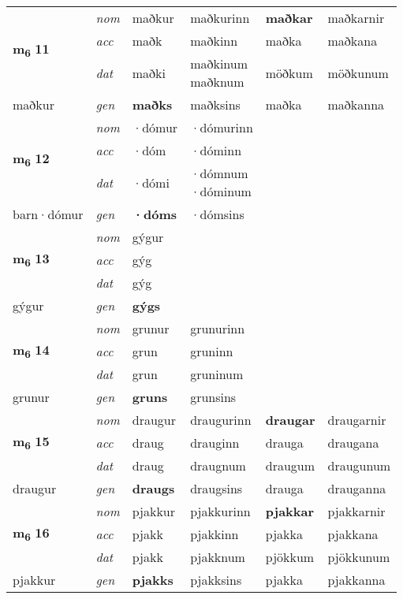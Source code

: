 \begin{longtable}[l]{X>{\footnotesize\itshape}XXXXX}
\multirow{3}{*}{{{\textbf{m{\textsubscript{6}}} \Large{\textbf{11}}}}} & nom & maðkur & maðkurinn & \textbf{maðkar} & maðkarnir \\*
 & acc & maðk & maðkinn & maðka & maðkana \\*
 & dat & maðki & \specialcell{maðkinum\\ maðknum} & möðkum & möðkunum \\*
 {\footnotesize{maðkur}} & gen & \textbf{maðks} & maðksins & maðka & maðkanna \\
\cmidrule{1-6}

\multirow{3}{*}{{{\textbf{m{\textsubscript{6}}} \Large{\textbf{12}}}}} & nom & ·dómur & ·dómurinn & \textbf{} &  \\*
 & acc & ·dóm & ·dóminn &  &  \\*
 & dat & ·dómi & \specialcell{·dómnum\\  ·dóminum} &  &  \\*
 {\footnotesize{barn\allowbreak ·dómur}} & gen & \textbf{·dóms} & ·dómsins &  &  \\
\cmidrule{1-6}

\multirow{3}{*}{{{\textbf{m{\textsubscript{6}}} \Large{\textbf{13}}}}} & nom & gýgur &  & \textbf{} &  \\*
 & acc & gýg &  &  &  \\*
 & dat & gýg &  &  &  \\*
 {\footnotesize{gýgur}} & gen & \textbf{gýgs} &  &  &  \\
\cmidrule{1-6}

\multirow{3}{*}{{{\textbf{m{\textsubscript{6}}} \Large{\textbf{14}}}}} & nom & grunur & grunurinn & \textbf{} &  \\*
 & acc & grun & gruninn &  &  \\*
 & dat & grun & gruninum &  &  \\*
 {\footnotesize{grunur}} & gen & \textbf{gruns} & grunsins &  &  \\
\cmidrule{1-6}

\multirow{3}{*}{{{\textbf{m{\textsubscript{6}}} \Large{\textbf{15}}}}} & nom & draugur & draugurinn & \textbf{draugar} & draugarnir \\*
 & acc & draug & drauginn & drauga & draugana \\*
 & dat & draug & draugnum & draugum & draugunum \\*
 {\footnotesize{draugur}} & gen & \textbf{draugs} & draugsins & drauga & drauganna \\
\cmidrule{1-6}

\multirow{3}{*}{{{\textbf{m{\textsubscript{6}}} \Large{\textbf{16}}}}} & nom & pjakkur & pjakkurinn & \textbf{pjakkar} & pjakkarnir \\*
 & acc & pjakk & pjakkinn & pjakka & pjakkana \\*
 & dat & pjakk & pjakknum & pjökkum & pjökkunum \\*
 {\footnotesize{pjakkur}} & gen & \textbf{pjakks} & pjakksins & pjakka & pjakkanna \\
\cmidrule{1-6}


\end{longtable}
